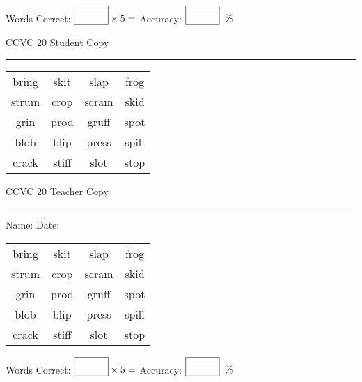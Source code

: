 \documentclass{memoir}
\begin{document}
\normalsize

Words Correct: $\fbox{\phantom{\huge 100}} \times 5 = $ Accuracy: $\fbox{\phantom{\huge 100}}\;\; \%$ 

\vfill

\newpage



\footnotesize \noindent
CCVC 20 \hfill Student Copy
\smallskip
\hrule

\Large

\setlength{\tabcolsep}{14pt}
\def\arraystretch{3}

{\selectfont


\begin{vplace}[0.5]
\begin{center}
\begin{tabular}{cccc}
bring      & skit & slap            & frog \\
strum & crop & scram & skid \\
grin     & prod & gruff & spot \\
blob & blip & press       & spill \\
crack       & stiff & slot & stop \\
\end{tabular}
\end{center}
\end{vplace}

}

\newpage

\footnotesize \noindent
CCVC 20 \hfill Teacher Copy
\smallskip
\hrule

\normalsize

\vfill

\noindent
Name: \underline{\hspace{1.75in}} \hfill Date: \underline{\hspace{1in}}

\Large

{\selectfont


\begin{vplace}[0.5]
\begin{center}
\begin{tabular}{cccc}
bring      & skit & slap            & frog \\
strum & crop & scram & skid \\
grin     & prod & gruff & spot \\
blob & blip & press       & spill \\
crack       & stiff & slot & stop \\
\end{tabular}
\end{center}
\end{vplace}



}

\normalsize

Words Correct: $\fbox{\phantom{\huge 100}} \times 5 = $ Accuracy: $\fbox{\phantom{\huge 100}}\;\; \%$ 

\vfill

\end{document}

